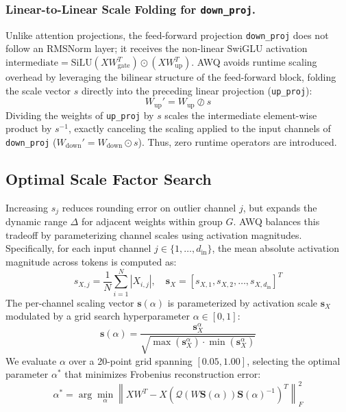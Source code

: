 \documentclass[runningheads,oribibl]{llncs}
\begin{document}
\subsubsection{Linear-to-Linear Scale Folding for \texttt{down\_proj}.}
Unlike attention projections, the feed-forward projection \texttt{down\_proj} does not follow an RMSNorm layer; it receives the non-linear SwiGLU activation $\text{intermediate} = \text{SiLU}(X W_{\text{gate}}^T) \odot (X W_{\text{up}}^T)$. AWQ avoids runtime scaling overhead by leveraging the bilinear structure of the feed-forward block, folding the scale vector $s$ directly into the preceding linear projection (\texttt{up\_proj}):
\begin{equation}
W_{\text{up}}' = W_{\text{up}} \oslash s
\end{equation}
Dividing the weights of \texttt{up\_proj} by $s$ scales the intermediate element-wise product by $s^{-1}$, exactly canceling the scaling applied to the input channels of \texttt{down\_proj} ($W_{\text{down}}' = W_{\text{down}} \odot s$). Thus, zero runtime operators are introduced.

\subsection{Optimal Scale Factor Search}
Increasing $s_j$ reduces rounding error on outlier channel $j$, but expands the dynamic range $\Delta$ for adjacent weights within group $G$. AWQ balances this tradeoff by parameterizing channel scales using activation magnitudes. Specifically, for each input channel $j \in \{1, \dots, d_{\text{in}}\}$, the mean absolute activation magnitude across tokens is computed as:
\begin{equation}
s_{X, j} = \frac{1}{N} \sum_{i=1}^N \left| X_{i, j} \right|, \quad \mathbf{s}_X = \left[ s_{X, 1}, s_{X, 2}, \dots, s_{X, d_{\text{in}}} \right]^T
\end{equation}
The per-channel scaling vector $\mathbf{s}(\alpha)$ is parameterized by activation scale $\mathbf{s}_X$ modulated by a grid search hyperparameter $\alpha \in [0, 1]$:
\begin{equation}
\mathbf{s}(\alpha) = \frac{\mathbf{s}_X^\alpha}{\sqrt{\max(\mathbf{s}_X^\alpha) \cdot \min(\mathbf{s}_X^\alpha)}}
\end{equation}
We evaluate $\alpha$ over a 20-point grid spanning $[0.05, 1.00]$, selecting the optimal parameter $\alpha^*$ that minimizes Frobenius reconstruction error:
\begin{equation}
\alpha^* = \arg\min_\alpha \left\| X W^T - X \left( \mathcal{Q}\left( W \mathbf{S}(\alpha) \right) \mathbf{S}(\alpha)^{-1} \right)^T \right\|_F^2
\end{equation}
\end{document}

